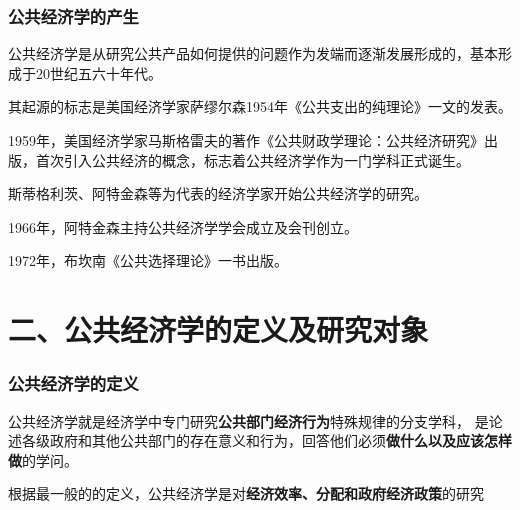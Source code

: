 \documentclass[aspectratio=169, 12pt]{beamer}
\begin{document}
\begin{frame}[plain]
    \frametitle{公共经济学的产生}
    公共经济学是从研究公共产品如何提供的问题作为发端而逐渐发展形成的，基本形成于20世纪五六十年代。
    \par
    其起源的标志是美国经济学家萨缪尔森1954年《公共支出的纯理论》一文的发表。
    \par
    1959年，美国经济学家马斯格雷夫的著作《公共财政学理论：公共经济研究》出版，首次引入公共经济的概念，标志着公共经济学作为一门学科正式诞生。
    \par
    斯蒂格利茨、阿特金森等为代表的经济学家开始公共经济学的研究。
    \par
    1966年，阿特金森主持公共经济学学会成立及会刊创立。
    \par
    1972年，布坎南《公共选择理论》一书出版。
\end{frame}

\section{二、公共经济学的定义及研究对象}

\begin{frame}[plain]
    \frametitle{公共经济学的定义}
    公共经济学就是经济学中专门研究\textbf{公共部门经济行为}特殊规律的分支学科，
    是论述各级政府和其他公共部门的存在意义和行为，回答他们必须\textbf{做什么以及应该怎样做}的学问。
    \par
    根据最一般的的定义，公共经济学是对\textbf{经济效率、分配和政府经济政策}的研究
\end{frame}
\end{document}
